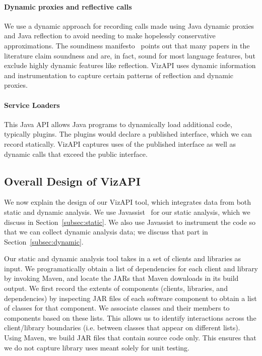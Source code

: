 \paragraph{Dynamic proxies and reflective calls} We use a dynamic approach for recording calls made using Java dynamic proxies and Java reflection to avoid needing to make hopelessly conservative approximations. The soundiness manifesto~\cite{livshits15:_in_defen_sound} points out that many papers in the literature claim soundness and are, in fact, sound for most language features, but exclude highly dynamic features like reflection. VizAPI uses dynamic information and instrumentation to capture certain patterns of reflection and dynamic proxies.

\paragraph{Service Loaders} This Java API allows Java programs to dynamically load additional code, typically plugins. The plugins would declare a published interface, which we can record statically. VizAPI captures uses of the published interface as well as dynamic calls that exceed the public interface.


\subsection{Overall Design of VizAPI}
We now explain the design of our VizAPI tool, which integrates data from both static and dynamic analysis.
We use Javassist~\cite{chiba00:_load_struc_reflec_java} for our static analysis, which we discuss in Section~\ref{subsec:static}. We also use Javassist to instrument the code so that we can
collect dynamic analysis data; we discuss that part in
Section~\ref{subsec:dynamic}.

Our static and dynamic analysis tool takes in a set of clients and libraries as input.
We programatically obtain a list of dependencies for each client and library by invoking Maven, and locate the JARs that Maven downloads in its build output.
We first record the extents of components (clients, libraries, and dependencies) by inspecting JAR
files of each software component to obtain a
list of classes for that component. We associate classes and their
members to components based on these lists.  This allows us to
identify interactions across the client/library boundaries (i.e. between classes that appear on different lists).
Using Maven, we build JAR
files that contain source code only. This ensures that we do not
capture library uses meant solely for unit testing. 

